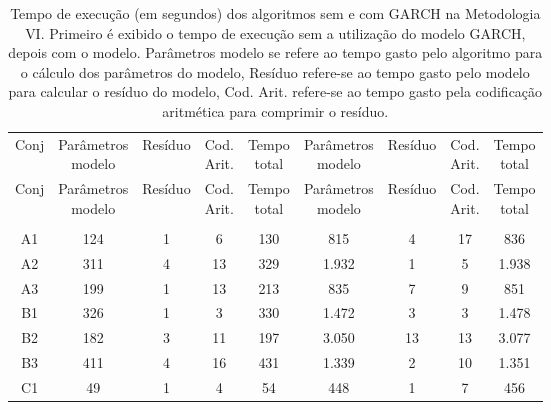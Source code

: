 \begin{center}
\begin{longtable}{ccccc|cccc}
\toprule
\rowcolor{white}
\caption[Metodologia VI: tempo de execução]{Tempo de execução (em segundos)
dos algoritmos sem e com GARCH na Metodologia VI. Primeiro é exibido o tempo de
execução sem a utilização do modelo GARCH, depois com o modelo. Parâmetros
modelo se refere ao tempo gasto pelo algoritmo para o cálculo dos parâmetros do
modelo, Resíduo refere-se ao tempo gasto pelo modelo para calcular o resíduo do
modelo, Cod. Arit. refere-se ao tempo gasto pela codificação aritmética para
comprimir o resíduo.} \label{tab:EvolucaoEntropiaMet6}\\
\midrule
Conj & \specialcell{Parâmetros\\modelo} &
Resíduo & \specialcell{Cod.\\Arit.} & \specialcell{Tempo\\total} &
\specialcell{Parâmetros\\modelo} &
Resíduo & \specialcell{Cod.\\Arit.} & \specialcell{Tempo\\total} \\
\midrule
\endfirsthead 
\midrule
\rowcolor{white}
Conj & \specialcell{Parâmetros\\modelo} &
Resíduo & \specialcell{Cod.\\Arit.} & \specialcell{Tempo\\total} &
\specialcell{Parâmetros\\modelo} &
Resíduo & \specialcell{Cod.\\Arit.} & \specialcell{Tempo\\total} \\
\toprule
\endhead
\midrule \\ %
\endfoot
\bottomrule 
\endlastfoot
A1&124&1&6&130&815&4&17&836\\
A2&311&4&13&329&1.932&1&5&1.938\\
A3&199&1&13&213&835&7&9&851\\
B1&326&1&3&330&1.472&3&3&1.478\\
B2&182&3&11&197&3.050&13&13&3.077\\
B3&411&4&16&431&1.339&2&10&1.351\\
C1&49&1&4&54&448&1&7&456\\

\end{longtable}
\end{center}

